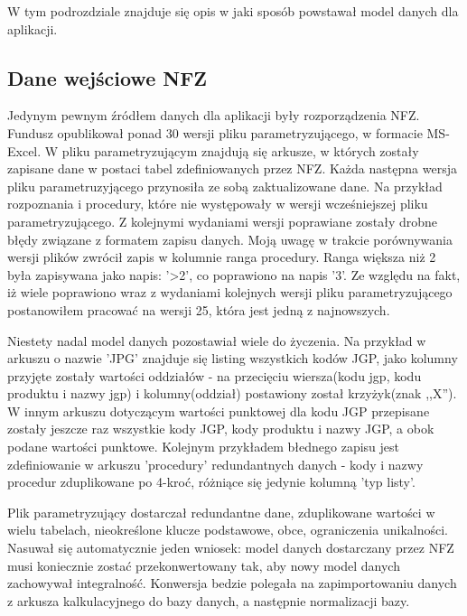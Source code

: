W tym podrozdziale znajduje się opis w jaki sposób powstawał model danych dla aplikacji.

\subsection{Dane wejściowe NFZ}
\label{sec:daneWejscioweNFZ}
Jedynym pewnym źródłem danych dla aplikacji były rozporządzenia NFZ. Fundusz opublikował ponad 30 wersji pliku parametryzującego, w formacie MS-Excel. W pliku parametryzującym znajdują się arkusze, w których zostały zapisane dane w postaci tabel zdefiniowanych przez NFZ. Każda następna wersja pliku parametruzyjącego przynosiła ze sobą zaktualizowane dane. Na przykład rozpoznania i procedury, które nie występowały w wersji wcześniejszej pliku parametryzującego. Z kolejnymi wydaniami wersji poprawiane zostały drobne błędy związane z formatem zapisu danych. Moją uwagę w trakcie porównywania wersji plików zwrócił zapis w kolumnie ranga procedury. Ranga większa niż 2 była zapisywana jako napis: '>2', co poprawiono na napis '3'. Ze względu na fakt, iż wiele poprawiono wraz z wydaniami kolejnych wersji pliku parametryzującego postanowiłem pracować na wersji 25, która jest jedną z najnowszych. 

Niestety nadal model danych pozostawiał wiele do życzenia. Na przykład w arkuszu o nazwie 'JPG' znajduje się listing wszystkich kodów JGP, jako kolumny przyjęte zostały wartości oddziałów - na przecięciu wiersza(kodu jgp, kodu produktu i nazwy jgp) i kolumny(oddział) postawiony został krzyżyk(znak ,,X''). W innym arkuszu dotyczącym wartości punktowej dla kodu JGP przepisane zostały jeszcze raz wszystkie kody JGP, kody produktu i nazwy JGP, a obok podane wartości punktowe. Kolejnym przykładem błednego zapisu jest zdefiniowanie w arkuszu 'procedury' redundantnych danych - kody i nazwy procedur zduplikowane po 4-kroć, różniące się jedynie kolumną 'typ listy'.

Plik parametryzujący dostarczał redundantne dane, zduplikowane wartości w wielu tabelach, nieokreślone klucze podstawowe, obce, ograniczenia unikalności. Nasuwał się automatycznie jeden wniosek: model danych dostarczany przez NFZ musi koniecznie zostać przekonwertowany tak, aby nowy model danych zachowywał integralność. Konwersja bedzie polegała na zapimportowaniu danych z arkusza kalkulacyjnego do bazy danych, a następnie normalizacji bazy.

